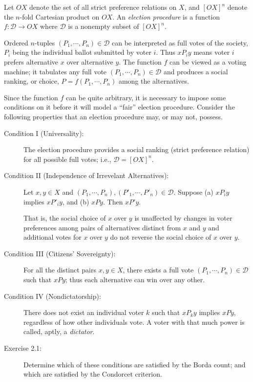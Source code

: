 \documentclass{article}
\begin{document}
Let $OX$ denote the set of all strict preference relations on $X$, and $[OX]^{n}$ denote the $n$-fold Cartesian product on $OX$. An \emph{election procedure} is a function $f : \mathcal{D} \rightarrow OX$ where $\mathcal{D}$ is a nonempty subset of $[OX]^{n}$.

Ordered $n$-tuples $(P_{1}, \cdots, P_{n}) \in \mathcal{D}$ can be interpreted as full votes of the society, $P_{i}$ being the individual ballot submitted by voter $i$. Thus $xP_{i}y$ means voter $i$ prefers alternative $x$ over alternative $y$. The function $f$ can be viewed as a voting machine; it tabulates any full vote $(P_{1}, \cdots, P_{n}) \in \mathcal{D}$ and produces a social ranking, or choice, $P = f(P_{1}, \cdots, P_{n})$ among the alternatives.

Since the function $f$ can be quite arbitrary, it is necessary to impose some conditions on it before it will model a ``fair'' election procedure. Consider the following properties that an election procedure may, or may not, possess.

\begin{description}

\item[Condition I (Universality):] The election procedure provides a social ranking (strict preference relation) for all possible full votes; i.e., $\mathcal{D} = [OX]^{n}$.

\item[Condition II (Independence of Irrevelant Alternatives):] Let $x,y \in X$ and $(P_{1}, \cdots , P_{n}), (P'_{1}, \cdots, P'_{n}) \in \mathcal{D}$. Suppose (a) $xP_{i}y$ implies $xP'_{i}y$, and (b) $xPy$. Then $xP'y$.

  That is, the social choice of $x$ over $y$ is unaffected by changes in voter preferences among pairs of alternatives distinct from $x$ and $y$ and additional votes for $x$ over $y$ do not reverse the social choice of $x$ over $y$.

\item[Condition III (Citizens' Sovereignty):] For all the distinct pairs $x,y \in X$, there exists a full vote $(P_{1}, \cdots, P_{n}) \in \mathcal{D}$ such that $xPy$; thus each alternative can win over any other.

\item[Condition IV (Nondictatorship):] There does not exist an individual voter $k$ such that $xP_{k}y$ implies $xPy$, regardless of how other individuals vote. A voter with that much power is called, aptly, a \emph{dictator}.

\item[Exercise 2.1:] Determine which of these conditions are satisfied by the Borda count; and which are satisfied by the Condorcet criterion.

\end{description}
\end{document}
